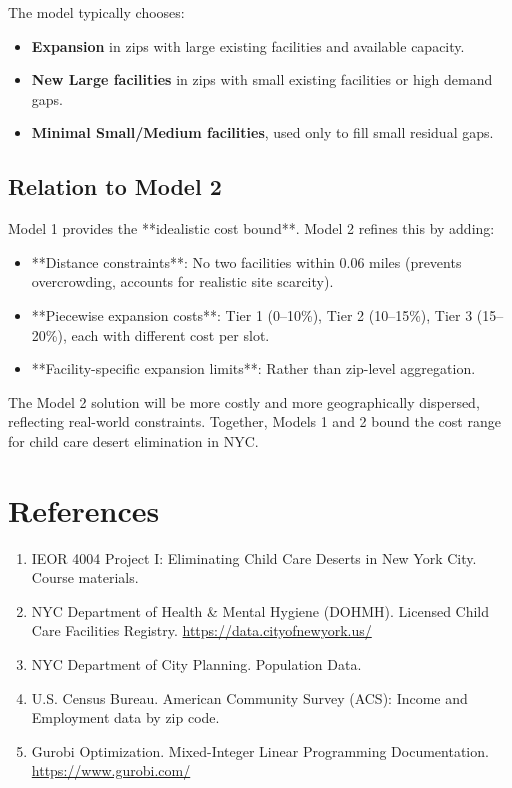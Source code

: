 \documentclass[12pt]{article}
\begin{document}
The model typically chooses:

\begin{itemize}
    \item \textbf{Expansion} in zips with large existing facilities and available capacity.
    \item \textbf{New Large facilities} in zips with small existing facilities or high demand gaps.
    \item \textbf{Minimal Small/Medium facilities}, used only to fill small residual gaps.
\end{itemize}

\subsection{Relation to Model 2}

Model 1 provides the **idealistic cost bound**. Model 2 refines this by adding:

\begin{itemize}
    \item **Distance constraints**: No two facilities within 0.06 miles (prevents overcrowding, accounts for realistic site scarcity).
    \item **Piecewise expansion costs**: Tier 1 (0--10\%), Tier 2 (10--15\%), Tier 3 (15--20\%), each with different cost per slot.
    \item **Facility-specific expansion limits**: Rather than zip-level aggregation.
\end{itemize}

\noindent
The Model 2 solution will be more costly and more geographically dispersed, reflecting real-world constraints. 
Together, Models 1 and 2 bound the cost range for child care desert elimination in NYC.

\section{References}

\begin{enumerate}
    \item IEOR 4004 Project I: Eliminating Child Care Deserts in New York City. Course materials.
    
    \item NYC Department of Health \& Mental Hygiene (DOHMH). Licensed Child Care Facilities Registry. 
    \url{https://data.cityofnewyork.us/}
    
    \item NYC Department of City Planning. Population Data.
    
    \item U.S. Census Bureau. American Community Survey (ACS): Income and Employment data by zip code.
    
    \item Gurobi Optimization. Mixed-Integer Linear Programming Documentation. 
    \url{https://www.gurobi.com/}
\end{enumerate}
\end{document}
